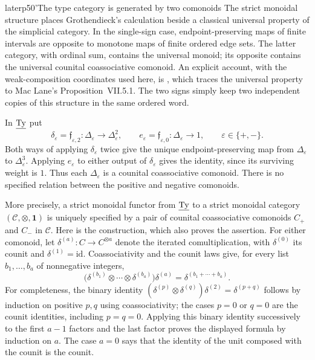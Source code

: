 \begin{dcomment}{later}{p50'}{The type category is generated by two comonoids}
The strict monoidal structure places Grothendieck's calculation beside a classical universal property of the simplicial category. In the single-sign case, endpoint-preserving maps of finite intervals are opposite to monotone maps of finite ordered edge sets. The latter category, with ordinal sum, contains the universal monoid; its opposite contains the universal counital coassociative comonoid. An explicit account, with the weak-composition coordinates used here, is \citet[Appendix~D.1--D.2, especially Proposition~D.2, pp.~713--716]{AguiarMahajan2010}, which traces the universal property to Mac Lane's Proposition~VII.5.1. The two signs simply keep two independent copies of this structure in the same ordered word.

In $\underline{\mathrm{Ty}}$ put
\[
 \delta_\varepsilon=\mathfrak f_{\varepsilon,2}:
      \Delta_\varepsilon\longrightarrow\Delta_\varepsilon^2,
 \qquad
 e_\varepsilon=\mathfrak f_{\varepsilon,0}:
      \Delta_\varepsilon\longrightarrow1,
 \qquad \varepsilon\in\{+,-\}.
\]
Both ways of applying $\delta_\varepsilon$ twice give the unique endpoint-preserving map from $\Delta_\varepsilon$ to $\Delta_\varepsilon^3$. Applying $e_\varepsilon$ to either output of $\delta_\varepsilon$ gives the identity, since its surviving weight is $1$. Thus each $\Delta_\varepsilon$ is a counital coassociative comonoid. There is no specified relation between the positive and negative comonoids.

More precisely, a strict monoidal functor from $\underline{\mathrm{Ty}}$ to a strict monoidal category $(\mathcal C,\otimes,\mathbf1)$ is uniquely specified by a pair of counital coassociative comonoids $C_+$ and $C_-$ in $\mathcal C$. Here is the construction, which also proves the assertion. For either comonoid, let $\delta^{(a)}:C\to C^{\otimes a}$ denote the iterated comultiplication, with $\delta^{(0)}$ its counit and $\delta^{(1)}=\mathrm{id}$. Coassociativity and the counit laws give, for every list $b_1,\ldots,b_a$ of nonnegative integers,
\[
 \bigl(\delta^{(b_1)}\otimes\cdots\otimes\delta^{(b_a)}\bigr)
       \delta^{(a)}
 =\delta^{(b_1+\cdots+b_a)}.
\]
For completeness, the binary identity
$(\delta^{(p)}\otimes\delta^{(q)})\delta^{(2)}
 =\delta^{(p+q)}$ follows by induction on positive $p,q$ using coassociativity; the cases $p=0$ or $q=0$ are the counit identities, including $p=q=0$. Applying this binary identity successively to the first $a-1$ factors and the last factor proves the displayed formula by induction on $a$. The case $a=0$ says that the identity of the unit composed with the counit is the counit.


\end{dcomment}
